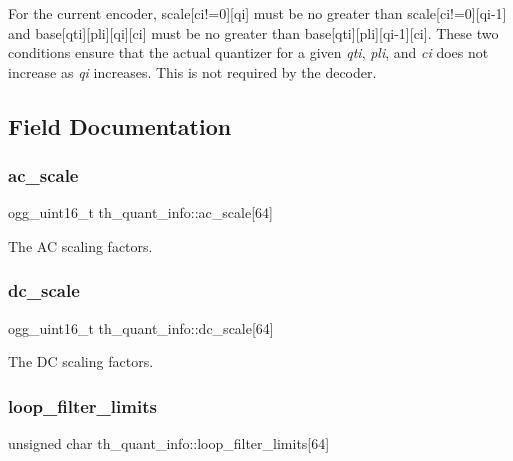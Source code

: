 For the current encoder, {\ttfamily scale[ci!=0][qi]} must be no greater than {\ttfamily scale[ci!=0][qi-\/1]} and {\ttfamily base[qti][pli][qi][ci]} must be no greater than {\ttfamily base[qti][pli][qi-\/1][ci]}. These two conditions ensure that the actual quantizer for a given {\itshape qti}, {\itshape pli}, and {\itshape ci} does not increase as {\itshape qi} increases. This is not required by the decoder. 

\subsection{Field Documentation}
\mbox{\label{structth__quant__info_a102f079c8f4a135dc0895c10768aeb06}} 
\subsubsection{ac\+\_\+scale}
{\footnotesize\ttfamily ogg\+\_\+uint16\+\_\+t th\+\_\+quant\+\_\+info\+::ac\+\_\+scale[64]}



The AC scaling factors. 

\mbox{\label{structth__quant__info_ad5c1c0d1aa4127fcf864ae747d732ed9}} 
\subsubsection{dc\+\_\+scale}
{\footnotesize\ttfamily ogg\+\_\+uint16\+\_\+t th\+\_\+quant\+\_\+info\+::dc\+\_\+scale[64]}



The DC scaling factors. 

\mbox{\label{structth__quant__info_a4ac56bf0a45b5743b36daf85d5cd9e33}} 
\subsubsection{loop\+\_\+filter\+\_\+limits}
{\footnotesize\ttfamily unsigned char th\+\_\+quant\+\_\+info\+::loop\+\_\+filter\+\_\+limits[64]}




